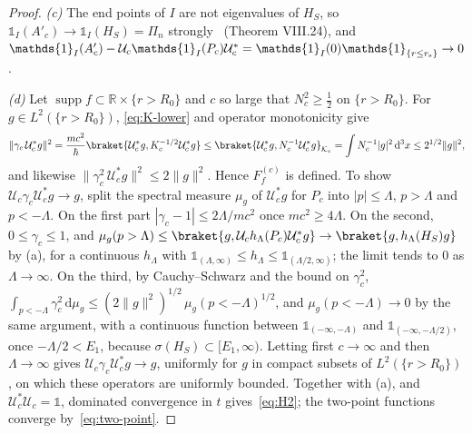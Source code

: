 \documentclass[%
 aip,
 jmp,
 amsmath,amssymb,
 reprint, onecolumn
]{revtex4-1}
\theoremstyle{definition}
\theoremstyle{remark}
\newcommand{\R}{\mathbb{R}}
\newcommand{\K}{\mathcal{K}}
\newcommand{\one}{\mathds{1}}
\newcommand{\rmd}{\mathrm{d}}
\DeclareMathOperator{\supp}{supp}
\begin{document}
\begin{proof}
\emph{(c)} The end points of $I$ are not eigenvalues of $H_S$, so
$\one_I(A'_c)\to\one_I(H_S)=\Pi_n$ strongly~\cite{ReedSimon1972}
(Theorem VIII.24), and $\one_I(A'_c)-\mathcal{U}_c\one_I(P_c)
\mathcal{U}_c^*=\one_I(0)\one_{\{r\leq r_{\rm s}\}}\to0$.

\emph{(d)} Let $\supp f\subset\R\times\{r>R_0\}$ and $c$ so large that
$N_c^2\geq\frac12$ on $\{r>R_0\}$. For $g\in L^2(\{r>R_0\})$,
\eqref{eq:K-lower} and operator monotonicity give
\begin{equation}\label{eq:gamma-bound}
\|\gamma_c\,\mathcal{U}_c^*g\|^2=\frac{mc^2}{\hbar}\braket{\mathcal{U}_c^*g,
K_c^{-1/2}\mathcal{U}_c^*g}\leq\braket{\mathcal{U}_c^*g,N_c^{-1}
\mathcal{U}_c^*g}_{\K_c}=\int N_c^{-1}|g|^2\,\rmd^3x\leq2^{1/2}\|g\|^2,
\end{equation}
and likewise $\|\gamma_c^2\,\mathcal{U}_c^*g\|^2\leq2\|g\|^2$. Hence
$F_f^{(c)}$ is defined. To show $\mathcal{U}_c\gamma_c\mathcal{U}_c^*g
\to g$, split the spectral measure $\mu_g$ of $\mathcal{U}_c^*g$ for
$P_c$ into $|p|\leq\Lambda$, $p>\Lambda$ and $p<-\Lambda$. On the first
part $|\gamma_c-1|\leq2\Lambda/mc^2$ once $mc^2\geq4\Lambda$. On the
second, $0\leq\gamma_c\leq1$, and $\mu_g(p>\Lambda)\leq\braket{g,
\mathcal{U}_ch_\Lambda(P_c)\mathcal{U}_c^*g}\to\braket{g,h_\Lambda(H_S)g}$
by (a), for a continuous $h_\Lambda$ with $\one_{(\Lambda,\infty)}\leq
h_\Lambda\leq\one_{(\Lambda/2,\infty)}$; the limit tends to $0$ as
$\Lambda\to\infty$. On the third, by Cauchy--Schwarz and the bound on
$\gamma_c^2$, $\int_{p<-\Lambda}\gamma_c^2\,\rmd\mu_g\leq(2\|g\|^2)^{1/2}
\,\mu_g(p<-\Lambda)^{1/2}$, and $\mu_g(p<-\Lambda)\to0$ by the same
argument, with a continuous function between $\one_{(-\infty,-\Lambda)}$
and $\one_{(-\infty,-\Lambda/2)}$, once $-\Lambda/2<E_1$, because
$\sigma(H_S)\subset[E_1,\infty)$. Letting first $c\to\infty$ and then $\Lambda\to\infty$ gives
$\mathcal{U}_c\gamma_c\mathcal{U}_c^*g\to g$, uniformly for $g$ in
compact subsets of $L^2(\{r>R_0\})$, on which these operators are
uniformly bounded. Together with (a), and $\mathcal{U}_c^*\mathcal{U}_c=
\one$, dominated convergence in $t$ gives~\eqref{eq:H2}; the two-point
functions converge by~\eqref{eq:two-point}.
\end{proof}
\end{document}
